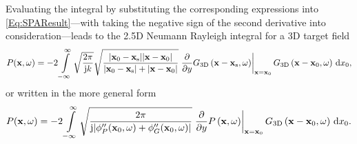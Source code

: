 Evaluating the integral by substituting the corresponding expressions into \eqref{Eq:SPAResult}---with taking the negative sign of the second derivative into consideration---leads to the 2.5D Neumann Rayleigh integral for a 3D target field
\begin{equation}
\label{Eq:Rayleigh25DPointSrc}
P(\mathbf{x},\omega) = -2 \int\limits_{-\infty}^{\infty}\sqrt{ \frac{2\pi}{\mathrm{j} k} }\sqrt{\frac{|\mathbf{x}_0-\mathbf{x}_{\mathrm{s}}| |\mathbf{x}-\mathbf{x}_0|}{|\mathbf{x}_0-\mathbf{x}_{\mathrm{s}}| + |\mathbf{x}-\mathbf{x}_0|}} \left. \frac{\partial}{\partial y}  G_{3\text{D}}\left( \mathbf{x}-\mathbf{x}_{\mathrm{s}},\omega \right) \right|_{\mathbf{x} = \mathbf{x}_0} G_{3\text{D}}\left( \mathbf{x}-\mathbf{x}_0,\omega \right)\,\mathrm{d} x_0,
\end{equation}
or written in the more general form
\begin{equation}
\label{Eq:Rayleigh25DGeneral}
P(\mathbf{x},\omega) = -2 \int\limits_{-\infty}^{\infty}
\sqrt{\frac{2\pi}{\mathrm{j}| \phi_P''(\mathbf{x}_0,\omega) + \phi_G''(\mathbf{x}_0,\omega)|}} 
\left. \frac{\partial}{\partial y}  P\left( \mathbf{x},\omega \right) \right|_{\mathbf{x} = \mathbf{x}_0} 
G_{3\text{D}}\left( \mathbf{x}-\mathbf{x}_0,\omega \right)\,\mathrm{d} x_0.
\end{equation}

